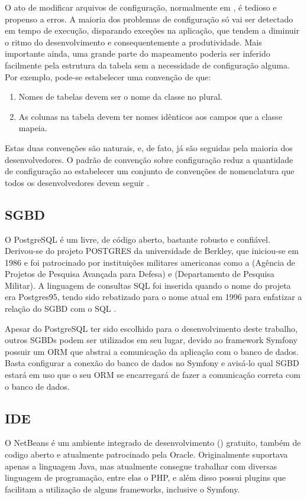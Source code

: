 O ato de modificar arquivos de configuração, normalmente em , é tedioso e propenso
a erros. A maioria dos problemas de configuração só vai ser detectado em tempo de execução,
disparando exceções na aplicação, que tendem a diminuir o ritmo do desenvolvimento e 
consequentemente a produtividade. Mais importante ainda, uma grande parte do
mapeamento poderia ser inferido facilmente pela estrutura da tabela sem a necessidade
de configuração alguma. Por exemplo, pode-se estabelecer uma convenção de que:
\begin{enumerate}
\item Nomes de tabelas devem ser o nome da classe no plural.
\item As colunas na tabela devem ter nomes idênticos aos campos que a classe mapeia.
\end{enumerate}

Estas duas convenções são naturais, e, de fato, já são seguidas pela maioria dos desenvolvedores.
O padrão de convenção sobre configuração reduz a quantidade de configuração ao estabelecer
um conjunto de convenções de nomenclatura que todos os desenvolvedores devem seguir \cite{Chen}.

\subsection{SGBD}
O PostgreSQL é um  livre, de código aberto,
bastante robusto e confiável. Derivou-se do projeto POSTGRES da universidade de Berkley, que 
iniciou-se em 1986 e foi patrocinado por instituições militares americanas como a 
 (Agência de Projetos de Pesquisa Avançada para Defesa) e  (Departamento de Pesquisa Militar).
A linguagem de consultas SQL foi inserida quando o nome do projeta era Postgres95, tendo sido
rebatizado para o nome atual em 1996 para enfatizar a relação do SGBD com o SQL \cite{postgresql}.

Apesar do PostgreSQL ter sido escolhido para o desenvolvimento deste trabalho, outros SGBDs
podem ser utilizados em seu lugar, devido ao framework Symfony possuir um ORM que abstrai
a comunicação da aplicação com o banco de dados. Basta configurar a conexão do banco de dados
no Symfony e avisá-lo qual SGBD estará em uso que o seu ORM se encarregará de fazer a comunicação
correta com o banco de dados.

\subsection{IDE}
O NetBeans é um ambiente integrado de desenvolvimento () gratuito, também de codigo aberto e 
atualmente patrocinado pela Oracle. Originalmente suportava apenas a linguagem Java, mas atualmente
consegue trabalhar com diversas linguagem de programação, entre elas o PHP, e além disso possui plugins
que facilitam a utilização de alguns frameworks, inclusive o Symfony.

